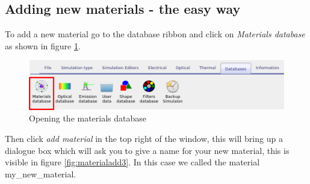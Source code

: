 \subsection{Adding new materials - the easy way}

To add a new material go to the database ribbon and click on \emph{Materials database} as shown in figure \ref{fig:materialadd1}.
\begin{figure}[H]
\centering
\includegraphics[height=0.18\textwidth]{./images/database_materials/database_materials.png}
\caption{Opening the materials database}
\label{fig:materialadd1}
\end{figure}

Then click \emph{add material} in the top right of the window, this will bring up a dialogue box which will ask you to give a name for your new material, this is visible in figure \ref{fig:materialadd3}. In this case we called the material my\_new\_material.

